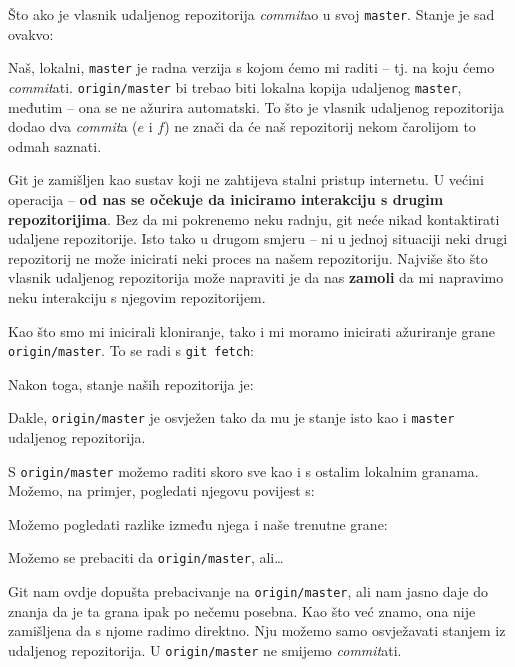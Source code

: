 Što ako je vlasnik udaljenog repozitorija \emph{commit}ao u svoj \verb+master+.
Stanje je sad ovakvo:



Naš, lokalni, \verb+master+ je radna verzija s kojom ćemo mi raditi -- tj. na koju ćemo \emph{commit}ati.
\verb+origin/master+ bi trebao biti lokalna kopija udaljenog \verb+master+, međutim -- ona se ne ažurira automatski.
To što je vlasnik udaljenog repozitorija dodao dva \emph{commit}a ($e$ i $f$) ne znači da će naš repozitorij nekom čarolijom to odmah saznati.

Git je zamišljen kao sustav koji ne zahtijeva stalni pristup internetu.
U većini operacija -- \textbf{od nas se očekuje da iniciramo interakciju s drugim repozitorijima}.
Bez da mi pokrenemo neku radnju, git neće nikad kontaktirati udaljene repozitorije.
Isto tako u drugom smjeru -- ni u jednoj situaciji neki drugi repozitorij ne može inicirati neki proces na našem repozitoriju.
Najviše što što vlasnik udaljenog repozitorija može napraviti je da nas \textbf{zamoli} da mi napravimo neku interakciju s njegovim repozitorijem.

Kao što smo mi inicirali kloniranje, tako i mi moramo inicirati ažuriranje grane \verb+origin/master+.
To se radi s \verb+git fetch+:



Nakon toga, stanje naših repozitorija je:



Dakle, \verb+origin/master+ je osvježen tako da mu je stanje isto kao i \verb+master+ udaljenog repozitorija.

S \verb+origin/master+ možemo raditi skoro sve kao i s ostalim lokalnim granama.
Možemo, na primjer, pogledati njegovu povijest s:


Možemo pogledati razlike između njega i naše trenutne grane:


Možemo se prebaciti da \verb+origin/master+, ali\dots



Git nam ovdje dopušta prebacivanje na \verb+origin/master+, ali nam jasno daje do znanja da je ta grana ipak po nečemu posebna.
Kao što već znamo, ona nije zamišljena da s njome radimo direktno.
Nju možemo samo osvježavati stanjem iz udaljenog repozitorija.
U \verb+origin/master+ ne smijemo \emph{commit}ati.

